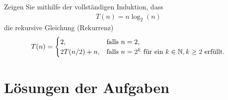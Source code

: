 \begin{myexercise}\label{myexercise:0503}
	Zeigen Sie mithilfe der vollständigen Induktion, dass
	\begin{align*}
		T(n) = n\log_2(n)
	\end{align*}
	die rekursive Gleichung (Rekurrenz)
	\[
		T(n) =
		\begin{cases}
			2,           & \text{falls $n = 2$,}                                     \\
			2T(n/2) + n, & \text{falls $n = 2^k$ für ein $k\in\mathbb{N}, k\geq 2$ erfüllt.}
		\end{cases}
	\]
\end{myexercise}

\clearpage
\section{Lösungen der Aufgaben}

